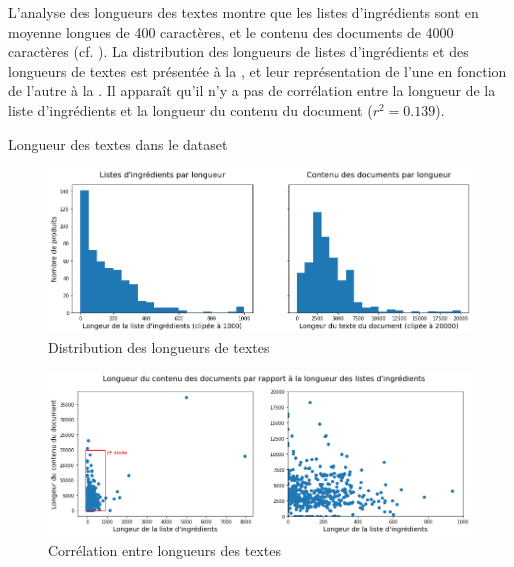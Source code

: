         L'analyse des longueurs des textes montre que les listes d'ingrédients sont en moyenne longues de 400 caractères, et le contenu des documents de 4000 caractères (cf. ).
        La distribution des longueurs de listes d'ingrédients et des longueurs de textes est présentée à la , et leur représentation de l'une en fonction de l'autre à la .
        Il apparaît qu'il n'y a pas de corrélation entre la longueur de la liste d'ingrédients et la longueur du contenu du document ($r^{2} = 0.139$).
        \begin{table}[htbp]
            \begin{center}
            {\scriptsize
            
            }
            \caption{Longueur des textes dans le dataset}
            \label{tbl:text_lengths}
            \end{center}
        \end{table}       
        \begin{figure}[htbp]
            \begin{center}
            \includegraphics[width=0.9\linewidth]{img/text_lengths.png}
            \end{center}
            \caption{Distribution des longueurs de textes}
            \label{fig:text_length}
        \end{figure}     
        \begin{figure}[htbp]
            \begin{center}
            \includegraphics[width=0.9\linewidth]{img/text_lengths_2.png}
            \end{center}
            \caption{Corrélation entre longueurs des textes}
            \label{fig:text_length_2}
        \end{figure}     
        
